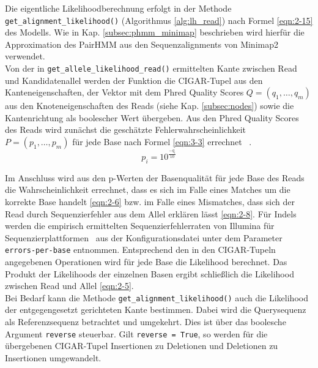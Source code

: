 Die eigentliche Likelihoodberechnung erfolgt in der Methode \linebreak \lstinline|get_alignment_likelihood()| (Algorithmus \ref{alg:lh_read}) nach Formel \eqref{eqn:2-15} des Modells. Wie in Kap. \ref{subsec:phmm_minimap} beschrieben wird hierfür die Approximation des PairHMM aus den Sequenzalignments von Minimap2 verwendet.\\

Von der in \lstinline|get_allele_likelihood_read()| ermittelten Kante zwischen Read und Kandidatenallel werden der Funktion die CIGAR-Tupel aus den Kanteneigenschaften, der Vektor mit dem  Phred Quality Scores $Q =(q_{1}, \dots, q_{m})$ aus den Knoteneigenschaften des Reads (siehe Kap. \ref {subsec:nodes}) sowie die Kantenrichtung als boolescher Wert übergeben. Aus den Phred Quality Scores des Reads wird zunächst die geschätzte Fehlerwahrscheinlichkeit $ P=(p_{1}, \dots, p_{m}) $ für jede Base nach Formel \eqref{eqn:3-3} errechnet ~\cite{ewing_1998}.  
\begin{equation} \label{eqn:3-3}
\tag{3-3}
p_{i} = 10^{\frac{-q_{i}}{10}}
\end{equation}

Im Anschluss wird aus den p-Werten der Basenqualität für jede Base des Reads die Wahrscheinlichkeit errechnet, dass es sich im Falle eines Matches um die korrekte Base handelt \eqref{eqn:2-6} bzw. im Falle eines Mismatches, dass sich der Read durch Sequenzierfehler aus dem Allel erklären lässt \eqref{eqn:2-8}. Für Indels werden die empirisch ermittelten Sequenzierfehlerraten von Illumina für Sequenzierplattformen~\cite{schirmer_2016} aus der Konfigurationsdatei unter dem Parameter \lstinline|errors-per-base| entnommen. Entsprechend den in den CIGAR-Tupeln angegebenen Operationen wird für jede Base die Likelihood berechnet. Das Produkt der Likelihoods der einzelnen Basen ergibt schließlich die Likelihood zwischen Read und Allel \eqref{eqn:2-5}.\\

Bei Bedarf kann die Methode \lstinline|get_alignment_likelihood()| auch  die Likelihood der entgegengesetzt gerichteten Kante bestimmen. Dabei wird die Querysequenz als Referenzsequenz betrachtet und umgekehrt. Dies ist über das boolesche Argument \lstinline|reverse| steuerbar. Gilt \lstinline|reverse = True|, so werden für die übergebenen CIGAR-Tupel Insertionen zu Deletionen und Deletionen zu Insertionen umgewandelt.\\

